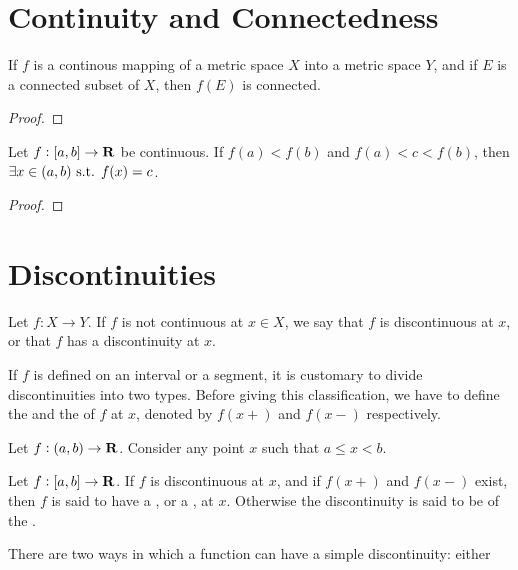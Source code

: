 \section{Continuity and Connectedness}
\begin{proposition}
If $f$ is a continous mapping of a metric space $X$ into a metric space $Y$, and if $E$ is a connected subset of $X$, then $f(E)$ is connected.
\end{proposition}

\begin{proof}

\end{proof}

\begin{theorem}
Let $f:[a,b]\to\mathbf R$ be continuous. If $f(a)<f(b)$ and $f(a)<c<f(b)$, then $\exists x\in(a,b)\text{ s.t. } f(x)=c$.
\end{theorem}

\begin{proof}

\end{proof}

\section{Discontinuities}
Let $f:X\to Y$. If $f$ is not continuous at $x\in X$, we say that $f$ is discontinuous at $x$, or that $f$ has a discontinuity at $x$.

If $f$ is defined on an interval or a segment, it is customary to divide discontinuities into two types. Before giving this classification, we have to define the  and the  of $f$ at $x$, denoted by $f(x+)$ and $f(x-)$ respectively.

\begin{definition}
Let $f:(a,b)\to\mathbf R$. Consider any point $x$ such that $a\le x<b$. 
\end{definition}

\begin{definition}[Discontinuities]
Let $f:[a,b]\to\mathbf R$. If $f$ is discontinuous at $x$, and if $f(x+)$ and $f(x-)$ exist, then $f$ is said to have a , or a , at $x$. Otherwise the discontinuity is said to be of the .
\end{definition}

There are two ways in which a function can have a simple discontinuity: either  

